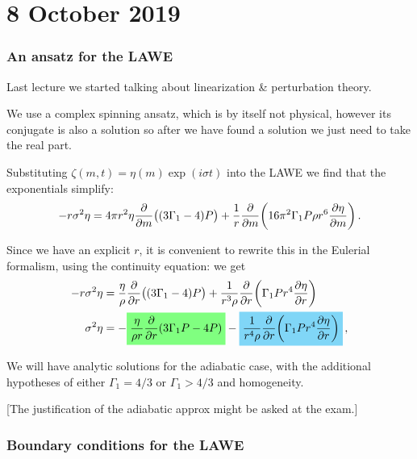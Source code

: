 \documentclass[main.tex]{subfiles}
\begin{document}
\section*{8 October 2019}

\subsubsection{An ansatz for the LAWE}

Last lecture we started talking about linearization \& perturbation theory.

We use a complex spinning ansatz, which is by itself not physical, however its conjugate is also a solution so after we have found a solution we just need to take the real part.

Substituting \(\zeta (m, t) = \eta (m) \exp(i \sigma t)\) into the LAWE we find that the exponentials simplify: 
%
\begin{align}
-r \sigma^2 \eta  =
4 \pi r^2 \eta \pdv{}{m} \qty((3 \Gamma_1 - 4)P)+
\frac{1}{r} \pdv{}{m} \qty(16 \pi^2 \Gamma_1 P \rho r^6 \pdv{\eta }{m} )  
\,.
\end{align}

Since we have an explicit \(r\), it is convenient to rewrite this in the Eulerial formalism, using the continuity equation: we get 
%
\begin{subequations}
\begin{align}
- r \sigma^2 \eta &= 
\frac{\eta }{\rho } \pdv{}{r} \qty((3\Gamma_1 - 4) P)
+ \frac{1}{r^3 \rho } \pdv{}{r} \qty(\Gamma_1 P r^{4} \pdv{\eta }{r})  \\
\sigma^2 \eta  &= - \hlc{green}{\frac{\eta }{\rho r} \pdv{}{r} \qty(3 \Gamma_1 P - 4P )} -\hlc{cyan}{\frac{1}{r^{4} \rho } \pdv{}{r} \qty(\Gamma_1 P r^{4} \pdv{\eta }{r})}
\,,
\end{align}
\end{subequations}
%

We will have analytic solutions for the adiabatic case, with the additional hypotheses of either \(\Gamma_1 = 4/3\) or \(\Gamma_1 > 4/3\) and homogeneity.

[The justification of the adiabatic approx might be asked at the exam.]

\subsubsection{Boundary conditions for the LAWE}
\end{document}
